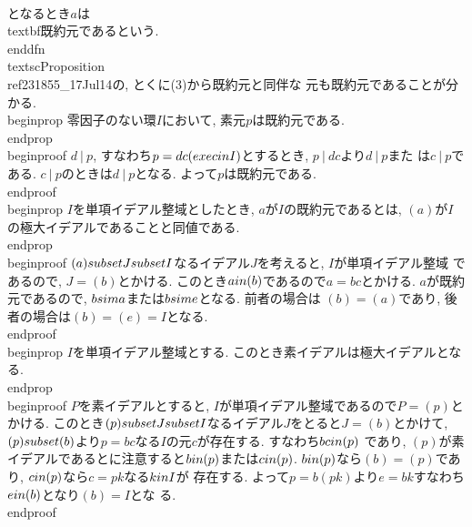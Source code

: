  \\[
 d~|~a\\Rightarrow d\\sim e\\text{または}d\\sim a
 \\]
 となるとき$a$は\\textbf{既約元}であるという.
\\end{dfn}
\\textsc{Proposition}~\\ref{231855_17Jul14}の, とくに(3)から既約元と同伴な
元も既約元であることが分かる.
\\begin{prop}
 零因子のない環$I$において, 素元$p$は既約元である.
\\end{prop}
\\begin{proof}
 $d~|~p$, すなわち$p=dc(\\exe c\\in I)$とするとき, $p~|~dc$より$d~|~p$また
 は$c~|~p$である. $c~|~p$のときは$d~|~p$となる. よって$p$は既約元である.
\\end{proof}
\\begin{prop}
 $I$を単項イデアル整域としたとき, $a$が$I$の既約元であるとは, $(a)$が$I$
 の極大イデアルであることと同値である.
\\end{prop}
\\begin{proof}
 $(a)\\subset J\\subset I$なるイデアル$J$を考えると, $I$が単項イデアル整域
 であるので, $J=(b)$とかける. このとき$a\\in (b)$であるので$a=bc$とかける.
 $a$が既約元であるので, $b\\sim a$または$b\\sim e$となる. 前者の場合は
 $(b)=(a)$であり, 後者の場合は$(b)=(e)=I$となる.
\\end{proof}
\\begin{prop}
 $I$を単項イデアル整域とする. このとき素イデアルは極大イデアルとなる.
\\end{prop}
\\begin{proof}
 $P$を素イデアルとすると, $I$が単項イデアル整域であるので$P=(p)$とかける.
 このとき$(p)\\subset J\\subset I$なるイデアル$J$をとると$J=(b)$とかけて,
 $(p)\\subset (b)$より$p=bc$なる$I$の元$c$が存在する. すなわち$bc\\in (p)$
 であり, $(p)$が素イデアルであるとに注意すると$b\\in(p)$または$c\\in
 (p)$. $b\\in (p)$なら$(b)=(p)$であり, $c\\in (p)$なら$c=pk$なる$k\\in I$が
 存在する. よって$p=b(pk)$より$e=bk$すなわち$e\\in (b)$となり$(b)=I$とな
 る.
\\end{proof}

